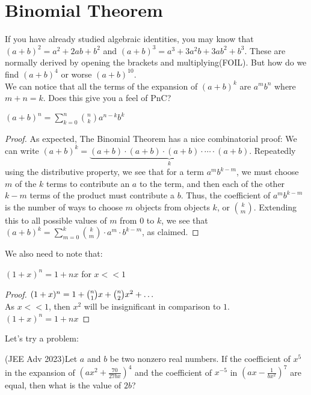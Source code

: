 \section{Binomial Theorem}
If you have already studied algebraic identities, you may know that $(a+b)^2=a^2+2ab+b^2$ and $(a+b)^3=a^3+3a^2b+3ab^2+b^3$. These are normally derived by opening the brackets and multiplying(FOIL). But how do we find $(a+b)^4$ or worse $(a+b)^{10}$. \\
We can notice that all the terms of the expansion of $(a+b)^k$ are $a^mb^n$ where $m+n=k$. Does this give you a feel of PnC?
\begin{theorem}
    $(a+b)^n = \sum_{k=0}^{n}\binom{n}{k}a^{n-k}b^k$
\end{theorem}
\begin{proof}
    As expected, The Binomial Theorem has a nice combinatorial proof:
We can write $(a+b)^k=\underbrace{ (a+b)\cdot(a+b)\cdot(a+b)\cdot\cdots\cdot(a+b) }_{k}$. Repeatedly using the distributive property, we see that for a term $a^m b^{k-m}$, we must choose $m$ of the $k$ terms to contribute an $a$ to the term, and then each of the other $k-m$ terms of the product must contribute a $b$. Thus, the coefficient of $a^m b^{k-m}$ is the number of ways to choose $m$ objects from objects $k$, or $\binom{k}{m}$. Extending this to all possible values of $m$ from $0$ to $k$, we see that $(a+b)^k = \sum_{m=0}^{k}{\binom{k}{m}}\cdot a^m\cdot b^{k-m}$, as claimed.
\end{proof}
We also need to note that:\\
\begin{theorem}
    $(1+x)^n=1+nx$ for $x << 1$
\end{theorem}
\begin{proof}
    $(1+x)^n\\
    = 1+\binom{n}{1}x+\binom{n}{2}x^2+\dots$\\
    As $x<<1$, then $x^2$ will be insignificant in comparison to $1$.\\
    $(1+x)^n=1+nx$
\end{proof}
Let's try a problem:\\
\begin{example}
    (JEE Adv 2023)Let $a$ and $b$ be two nonzero real numbers. If the coefficient of $x^5$ in the expansion of $(ax^2+\frac{70}{27bx})^4$ and the coefficient of $x^{-5}$ in $(ax-\frac{1}{bx^2})^7$ are equal, then what is the value of $2b$?
\end{example}
